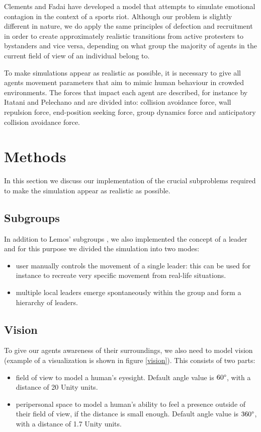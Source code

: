 \documentclass[9pt]{pnas-new}
\begin{document}
\bigskip
Clements and Fadai \cite{sportsriots} have developed a model that attempts to simulate emotional contagion in the context of a sports riot. Although our problem is slightly different in nature, we do apply the same principles of defection and recruitment in order to create approximately realistic transitions from active protesters to bystanders and vice versa, depending on what group the majority of agents in the current field of view of an individual belong to. 

\bigskip
To make simulations appear as realistic as possible, it is necessary to give all agents movement parameters that aim to mimic human behaviour in crowded environments. The forces that impact each agent are described, for instance by Itatani and Pelechano \cite{socialcrowdsimulation} and are divided into: collision avoidance force, wall repulsion force, end-position seeking force, group dynamics force and anticipatory collision avoidance force. 

\section*{Methods}

In this section we discuss our implementation of the crucial subproblems required to make the simulation appear as realistic as possible. 

\subsection*{Subgroups}
In addition to Lemos' subgroups \cite{protests}, we also implemented the concept of a leader and for this purpose we divided the simulation into two modes:
\begin{itemize}
    \item user manually controls the movement of a single leader: this can be used for instance to recreate very specific movement from real-life situations.
    \item multiple local leaders emerge spontaneously within the group and form a hierarchy of leaders.
\end{itemize}

\subsection*{Vision}
To give our agents awareness of their surroundings, we also need to model vision (example of a visualization is shown in figure \ref{vision}). This consists of two parts: 
\begin{itemize}
    \item field of view to model a human's eyesight. Default angle value is \begin{math}60\degree\end{math}, with a distance of 20 Unity units.
    \item peripersonal space to model a human's ability to feel a presence outside of their field of view, if the distance is small enough. Default angle value is \begin{math}360\degree\end{math}, with a distance of 1.7 Unity units.
\end{itemize}
\end{document}
